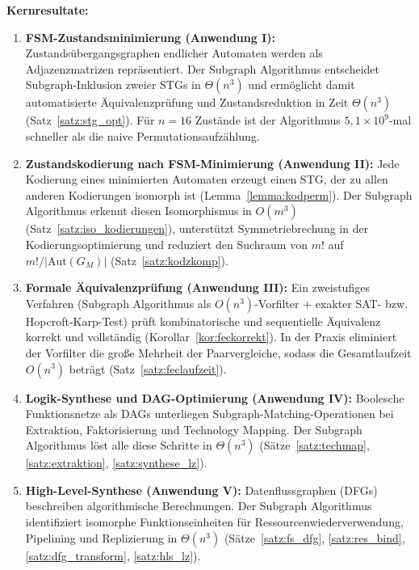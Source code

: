 ﻿\documentclass[a4paper,12pt]{article}
\theoremstyle{definition}
\begin{document}
\textbf{Kernresultate:}
\begin{enumerate}
  \item \textbf{FSM-Zustandsminimierung (Anwendung I):} Zustandsübergangsgraphen
        endlicher Automaten werden als Adjazenzmatrizen repräsentiert. Der Subgraph
        Algorithmus entscheidet Subgraph-Inklusion zweier STGs in $\Theta(n^3)$ und
        ermöglicht damit automatisierte Äquivalenzprüfung und Zustandsreduktion in
        Zeit $\Theta(n^3)$ (Satz~\ref{satz:stg_opt}). Für $n = 16$ Zustände ist der
        Algorithmus $5{,}1 \times 10^9$-mal schneller als die naive Permutationsaufzählung.

  \item \textbf{Zustandskodierung nach FSM-Minimierung (Anwendung II):} Jede
        Kodierung eines minimierten Automaten erzeugt einen STG, der zu allen anderen
        Kodierungen isomorph ist (Lemma~\ref{lemma:kodperm}). Der Subgraph Algorithmus
        erkennt diesen Isomorphismus in $O(m^3)$ (Satz~\ref{satz:iso_kodierungen}),
        unterstützt Symmetriebrechung in der Kodierungsoptimierung und reduziert den
        Suchraum von $m!$ auf $m!/|\text{Aut}(G_M)|$ (Satz~\ref{satz:kodzkomp}).

  \item \textbf{Formale Äquivalenzprüfung (Anwendung III):} Ein zweistufiges Verfahren
        (Subgraph Algorithmus als $O(n^3)$-Vorfilter + exakter SAT- bzw.
        Hopcroft-Karp-Test) prüft kombinatorische und sequentielle Äquivalenz korrekt
        und vollständig (Korollar~\ref{kor:feckorrekt}). In der Praxis eliminiert der
        Vorfilter die große Mehrheit der Paarvergleiche, sodass die Gesamtlaufzeit
        $O(n^3)$ beträgt (Satz~\ref{satz:feclaufzeit}).

  \item \textbf{Logik-Synthese und DAG-Optimierung (Anwendung IV):} Boolesche
        Funktionsnetze als DAGs unterliegen Subgraph-Matching-Operationen bei
        Extraktion, Faktorisierung und Technology Mapping. Der Subgraph Algorithmus
        löst alle diese Schritte in $\Theta(n^3)$ (Sätze~\ref{satz:techmap},
        \ref{satz:extraktion}, \ref{satz:synthese_lz}).

  \item \textbf{High-Level-Synthese (Anwendung V):} Datenflussgraphen (DFGs)
        beschreiben algorithmische Berechnungen. Der Subgraph Algorithmus identifiziert
        isomorphe Funktionseinheiten für Ressourcenwiederverwendung, Pipelining und
        Replizierung in $\Theta(n^3)$ (Sätze~\ref{satz:fs_dfg}, \ref{satz:res_bind},
        \ref{satz:dfg_transform}, \ref{satz:hls_lz}).


\end{enumerate}
\end{document}
